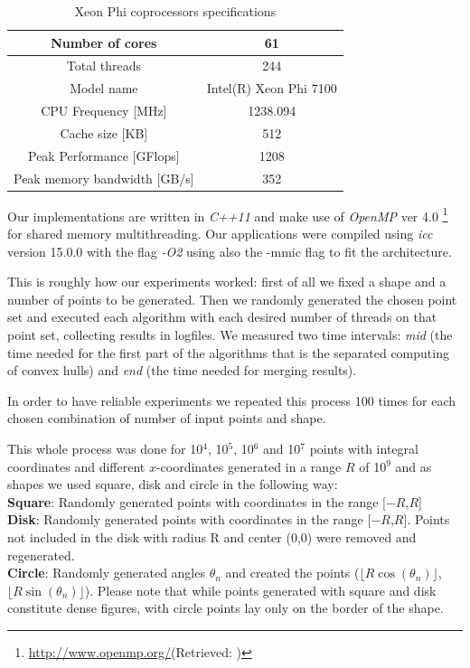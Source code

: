 \documentclass[letterpaper]{article}
\theoremstyle{definition}
\begin{document}
\begin{table}[!ht]
\begin{tabular}{|c|c|}
\hline Number of cores			& 61\\
\hline Total threads				& 244\\
\hline Model name				& Intel(R) Xeon Phi 7100\\
\hline CPU Frequency [MHz]		& 1238.094\\
\hline Cache size [KB]			& 512\\
\hline Peak Performance [GFlops]	& 1208\\
\hline Peak memory bandwidth [GB/s]		& 352\\
\hline
\end{tabular}
\caption{Xeon Phi coprocessors specifications}
\end{table}

Our implementations are written in \textit{C++11} and make use of \textit{OpenMP} ver 4.0 \footnote{\url{http://www.openmp.org/}(Retrieved: )} for shared memory multithreading.
Our applications were compiled using \textit{icc} version 15.0.0 with the flag \textit{-O2} using also the -mmic flag to fit the architecture.

This is roughly how our experiments worked:
first of all we fixed a shape and a number of points to be generated. Then we randomly generated the chosen point set and executed each algorithm with each desired number of threads on that point set, collecting results in logfiles. We measured two time intervals: \textit{mid} (the time needed for the first part of the algorithms that is the separated computing of convex hulls) and \textit{end} (the time needed for merging results).

In order to have reliable experiments we repeated this process 100 times for each chosen combination of number of input points and shape.

This whole process was done for 10$^4$, 10$^5$, 10$^6$ and 10$^7$ points with integral coordinates and different $x$-coordinates generated in a range $R$ of 10$^9$ and as shapes we used square, disk and circle in the following way:\\
{\bf Square}: Randomly generated points with coordinates in the range [$-R$,$R$]\\
{\bf Disk}: Randomly generated points with coordinates in the range [$-R$,$R$]. Points not included in the disk with radius R and center (0,0) were removed and regenerated.\\
{\bf Circle}: Randomly generated angles $\theta_n$ and created the points ($\lfloor R \cos(\theta_n)\rfloor$, $\lfloor R \sin(\theta_n)\rfloor$). Please note that while points generated with square and disk constitute dense figures, with circle points lay only on the border of the shape.
\end{document}
